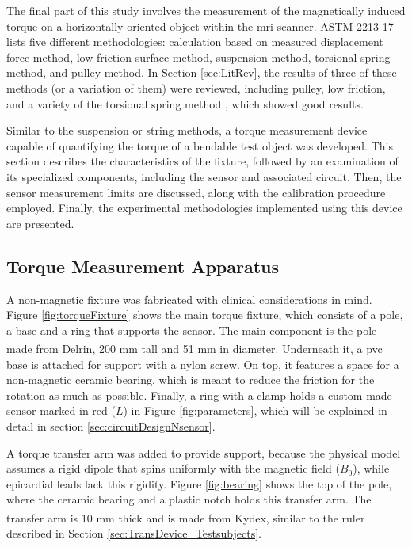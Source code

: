 The final part of this study involves the measurement of the magnetically induced torque on a horizontally-oriented object within the \gls{mri} scanner. ASTM 2213-17 \cite{astm2213} lists five different methodologies: calculation based on measured displacement force method, low friction surface method, suspension method, torsional spring method, and pulley method. In Section \ref{sec:LitRev}, the results of three of these methods (or a variation of them) were reviewed, including pulley, low friction, and a variety of the torsional spring method \cite{stoianovici2024,Woods2021_MRIdisplacement,Seo2021767}, which showed good results.

Similar to the suspension or string methods, a torque measurement device capable of quantifying the torque of a bendable test object was developed. This section describes the characteristics of the fixture, followed by an examination of its specialized components, including the sensor and associated circuit. Then, the sensor measurement limits are discussed, along with the calibration procedure employed. Finally, the experimental methodologies implemented using this device are presented.

\subsection{Torque Measurement Apparatus}
\label{sec:TorqMeasureApp}

A non-magnetic fixture was fabricated with clinical considerations in mind. Figure \ref{fig:torqueFixture} shows the main torque fixture, which consists of a pole, a base and a ring that supports the sensor. The main component is the pole made from Delrin\textsuperscript{\texttrademark}, 200 mm tall and 51 mm in diameter. Underneath it, a \gls{pvc} base is attached for support with a nylon screw. On top, it features a space for a non-magnetic ceramic bearing, which is meant to reduce the friction for the rotation as much as possible. Finally, a ring with a clamp holds a custom made sensor marked in red ($L$) in Figure \ref{fig:parameters}, which will be explained in detail in section \ref{sec:circuitDesignNsensor}. 

A torque transfer arm was added to provide support, because the physical model assumes a rigid dipole that spins uniformly with the magnetic field ($B_0$), while epicardial leads lack this rigidity. Figure \ref{fig:bearing} shows the top of the pole, where the ceramic bearing and a plastic notch holds this transfer arm. The transfer arm is 10 mm thick and is made from Kydex\textsuperscript{\texttrademark}, similar to the ruler described in Section \ref{sec:TransDevice_Testsubjects}. 

